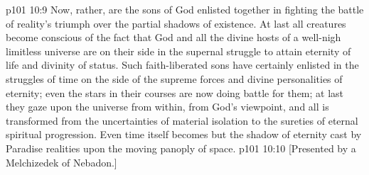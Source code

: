 \vs p101 10:9 Now, rather, are the sons of God enlisted together in fighting the battle of reality’s triumph over the partial shadows of existence. At last all creatures become conscious of the fact that God and all the divine hosts of a well\hyp{}nigh limitless universe are on their side in the supernal struggle to attain eternity of life and divinity of status. Such faith\hyp{}liberated sons have certainly enlisted in the struggles of time on the side of the supreme forces and divine personalities of eternity; even the stars in their courses are now doing battle for them; at last they gaze upon the universe from within, from God’s viewpoint, and all is transformed from the uncertainties of material isolation to the sureties of eternal spiritual progression. Even time itself becomes but the shadow of eternity cast by Paradise realities upon the moving panoply of space.
\vsetoff
\vs p101 10:10 [Presented by a Melchizedek of Nebadon.]
